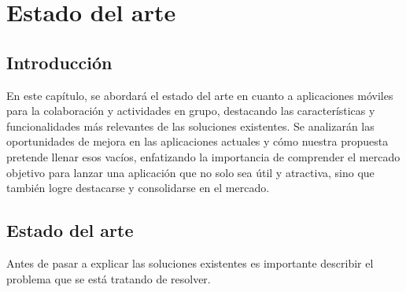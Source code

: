 \chapter{Estado del arte}
\section{Introducción}
En este capítulo, se abordará el estado del arte en
cuanto a aplicaciones móviles para la colaboración y
actividades en grupo, destacando las características y
funcionalidades más relevantes de las soluciones existentes.
Se analizarán las oportunidades de mejora en las aplicaciones actuales y cómo nuestra propuesta pretende llenar esos vacíos, 
enfatizando la importancia de comprender el mercado objetivo para lanzar una aplicación que no solo sea útil y atractiva, 
sino que también logre destacarse y consolidarse en el mercado.

\section{Estado del arte}

Antes de pasar a explicar las soluciones existentes es importante describir el problema que se está tratando de resolver.

